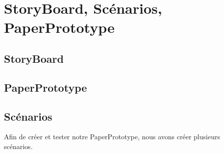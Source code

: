 \documentclass[a4paper,10pt]{article}
\begin{document}
\newpage
\section{StoryBoard, Scénarios, PaperPrototype}

\subsection{StoryBoard}

\subsection{PaperPrototype}

\subsection{Scénarios}
Afin de créer et tester notre PaperPrototype, nous avons créer plusieurs scénarios.
\end{document}
